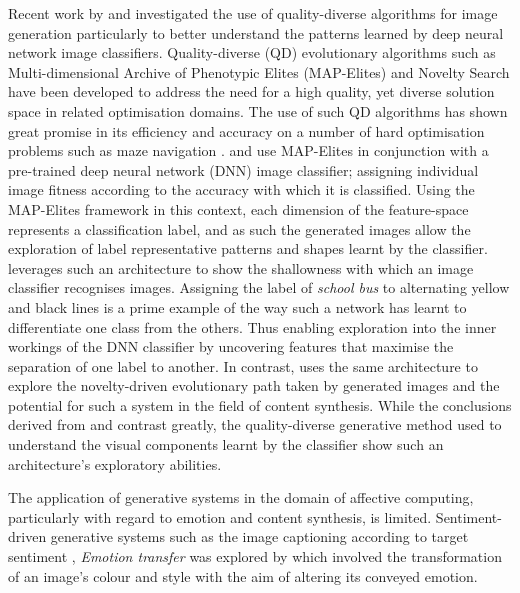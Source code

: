 \documentclass{article}
\begin{document}
Recent work by \citet{nguyen2015innovation} and \citet{nguyen2015deep} investigated the use of quality-diverse algorithms for image generation particularly to better understand the patterns learned by deep neural network image classifiers.
Quality-diverse (QD) evolutionary algorithms such as Multi-dimensional Archive of Phenotypic Elites (MAP-Elites) \citep{mouret2015illuminating} and Novelty Search \citep{lehman2008exploiting, lehman2011abandoning} have been developed to address the need for a high quality, yet diverse solution space in related optimisation domains.
The use of such QD algorithms has shown great promise in its efficiency and accuracy on a number of hard optimisation problems \citep{pugh2016quality} such as maze navigation \citep{lehman2011abandoning}.
\citet{nguyen2015deep} and \citet{nguyen2015innovation} use MAP-Elites in conjunction with a pre-trained deep neural network (DNN) image classifier; assigning individual image fitness according to the accuracy with which it is classified.
Using the MAP-Elites framework in this context, each dimension of the feature-space represents a classification label, and as such the generated images allow the exploration of label representative patterns and shapes learnt by the classifier.
\citet{nguyen2015deep} leverages such an architecture to show the shallowness with which an image classifier recognises images.
Assigning the label of \textit{school bus} to alternating yellow and black lines is a prime example of the way such a network has learnt to differentiate one class from the others.
Thus enabling exploration into the inner workings of the DNN classifier by uncovering features that maximise the separation of one label to another.
In contrast, \citet{nguyen2015innovation} uses the same architecture to explore the novelty-driven evolutionary path taken by generated images and the potential for such a system in the field of content synthesis.
While the conclusions derived from \citet{nguyen2015innovation} and \citet{nguyen2015deep} contrast greatly, the quality-diverse generative method used to understand the visual components learnt by the classifier show such an architecture's exploratory abilities.

The application of generative systems in the domain of affective computing, particularly with regard to emotion and content synthesis, is limited.
Sentiment-driven generative systems such as the image captioning according to target sentiment \citep{mathews2016senticap}, 
\textit{Emotion transfer} was explored by \citet{ali2017emotional} which involved the transformation of an image's colour and style with the aim of altering its conveyed emotion.
\end{document}
